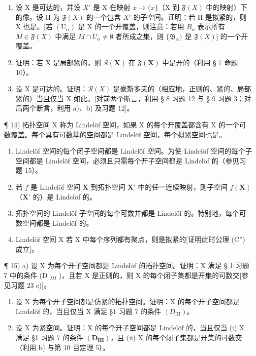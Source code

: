 \begin{enumerate}
\def\labelenumi{\alph{enumi})}
\setcounter{enumi}{1}
\item
  设 X 是可达的，并设 \(X'\) 是 X 在映射 \(x \to \{x\}\)（X 到 \(\mathfrak{F}(X)\) 中的映射）下的像。设 H 为 \(\mathfrak{F}(X)\) 的一个包含 \(X'\) 的子空间。证明：若 H 是拟紧的，则 X 也是。{[}若 \((\mathrm{U}_{\alpha})\) 是 X 的一个开覆盖，则注意：若用 \(B_{\alpha}\) 表示所有 \(M \in \mathfrak{F}(X)\) 中满足 \(M \cap U_{\alpha} \neq \emptyset\) 者所成之集，则 \(\{\mathfrak{B}_{\alpha}\}\) 是 \(\mathfrak{F}(X)]\) 的一个开覆盖。
\item
  证明：若 X 是局部紧的，则 \(\mathfrak{K}(\mathbf{X})\) 在 \(\mathfrak{F}(\mathbf{X})\) 中是开的（利用 § 7 命题 10）。
\item
  设 X 是可达的。证明：\(\mathcal{R}(X)\) 是豪斯多夫的（相应地，正则的、紧的、局部紧的）当且仅当 X 如此。{[}对前两个断言，利用 § 8 习题 12 与 § 9 习题 3；对后两个断言，利用 a)、b) 及习题 12{]}。
\end{enumerate}

¶ 14) 拓扑空间 X 称为 Lindelöf 空间，如果 X 的每个开覆盖都含有 X 的一个可数覆盖。每个具有可数基的空间都是 Lindelöf 空间，每个拟紧空间也是。

\begin{enumerate}
\def\labelenumi{\alph{enumi})}
\item
  Lindelöf 空间的每个闭子空间都是 Lindelöf 空间。为使 Lindelöf 空间的每个子空间都是 Lindelöf 空间，必须且只需每个开子空间都是 Lindelöf 的（参见习题 15）。
\item
  若 \(f\) 是 Lindelöf 空间 \(\mathbf{X}\) 到拓扑空间 \(\mathbf{X}'\) 中的任一连续映射，则子空间 \(f(\mathbf{X})\)（\(\mathbf{X}'\) 的）是 Lindelöf 的。
\item
  拓扑空间的 Lindelöf 子空间的每个可数并都是 Lindelöf 的。特别地，每个可数空间都是 Lindelöf 的。
\item
  Lindelöf 空间 X 若 X 中每个序列都有聚点，则是拟紧的{[}证明此时公理 (C'') 成立{]}。
\end{enumerate}

¶ 15) a) 设 X 为每个开子空间都是 Lindelöf 的拓扑空间。证明：X 满足 § 1 习题 7 中的条件 (D \(_{III}\) )，且若 X 是正则的，则 X 的每个闭子集都是开集的可数交{[}参见习题 23 c){]}。

\begin{enumerate}
\def\labelenumi{\alph{enumi})}
\setcounter{enumi}{1}
\item
  设 X 为每个开子空间都是仿紧的拓扑空间。证明：X 的每个开子空间都是 Lindelöf 的，当且仅当 X 满足 §1 习题 7 的条件 \((D_{\mathrm{III}})\)。
\item
  设 X 为紧空间。证明：X 的每个开子空间都是 Lindelöf 的，当且仅当 (i) X 满足 §1 习题 7 的条件 \((\mathbf{D}_{\mathbf{III}})\)，且 (ii) X 的每个闭子集都是开集的可数交（利用 b) 与第 10 目定理 5）。
\end{enumerate}

